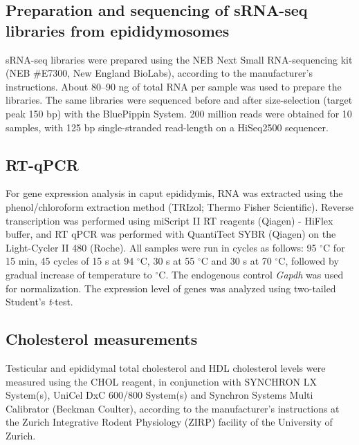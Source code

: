 \documentclass[12pt,twoside]{reedthesis}
\begin{document}
\hypertarget{preparation-and-sequencing-of-srna-seq-libraries-from-epididymosomes}{%
\subsection{Preparation and sequencing of sRNA-seq libraries from epididymosomes}\label{preparation-and-sequencing-of-srna-seq-libraries-from-epididymosomes}}

sRNA-seq libraries were prepared using the NEB Next Small RNA-sequencing kit (NEB \#E7300, New England BioLabs), according to the manufacturer's instructions. About 80--90 ng of total RNA per sample was used to prepare the libraries. The same libraries were sequenced before and after size-selection (target peak 150 bp) with the BluePippin System. 200 million reads were obtained for 10 samples, with 125 bp single-stranded read-length on a HiSeq2500 sequencer.

\hypertarget{rt-qpcr}{%
\subsection{RT-qPCR}\label{rt-qpcr}}

For gene expression analysis in caput epididymis, RNA was extracted using the phenol/chloroform extraction method (TRIzol; Thermo Fisher Scientific). Reverse transcription was performed using miScript \RN{2} RT reagents (Qiagen) - HiFlex buffer, and RT qPCR was performed with QuantiTect SYBR (Qiagen) on the Light-Cycler \RN{2} 480 (Roche). All samples were run in cycles as follows: 95 \(^{\circ}\)C for 15 min, 45 cycles of 15 s at 94 \(^{\circ}\)C, 30 s at 55 \(^{\circ}\)C and 30 s at 70 \(^{\circ}\)C, followed by gradual increase of temperature to \(^{\circ}\)C. The endogenous control \textit{Gapdh} was used for normalization. The expression level of genes was analyzed using two-tailed Student's \textit{t}-test.

\hypertarget{cholesterol-measurements}{%
\subsection{Cholesterol measurements}\label{cholesterol-measurements}}

Testicular and epididymal total cholesterol and HDL cholesterol levels were measured using the CHOL reagent, in conjunction with SYNCHRON LX System(s), UniCel DxC 600/800 System(s) and Synchron Systems Multi Calibrator (Beckman Coulter), according to the manufacturer's instructions at the Zurich Integrative Rodent Physiology (ZIRP) facility of the University of Zurich.
\end{document}

